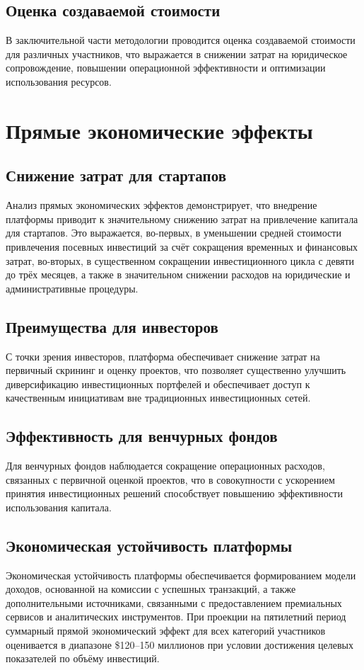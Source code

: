 \documentclass[
    candidate, %
    subf, %
    dotsinheaders=false,
]{disser}
\begin{document}
\subsection{Оценка создаваемой стоимости}
В заключительной части методологии проводится оценка создаваемой стоимости для различных участников, что выражается в снижении затрат на юридическое сопровождение, повышении операционной эффективности и оптимизации использования ресурсов.

\section{Прямые экономические эффекты}

\subsection{Снижение затрат для стартапов}
Анализ прямых экономических эффектов демонстрирует, что внедрение платформы приводит к значительному снижению затрат на привлечение капитала для стартапов. Это выражается, во-первых, в уменьшении средней стоимости привлечения посевных инвестиций за счёт сокращения временных и финансовых затрат, во-вторых, в существенном сокращении инвестиционного цикла с девяти до трёх месяцев, а также в значительном снижении расходов на юридические и административные процедуры.

\subsection{Преимущества для инвесторов}
С точки зрения инвесторов, платформа обеспечивает снижение затрат на первичный скрининг и оценку проектов, что позволяет существенно улучшить диверсификацию инвестиционных портфелей и обеспечивает доступ к качественным инициативам вне традиционных инвестиционных сетей.

\subsection{Эффективность для венчурных фондов}
Для венчурных фондов наблюдается сокращение операционных расходов, связанных с первичной оценкой проектов, что в совокупности с ускорением принятия инвестиционных решений способствует повышению эффективности использования капитала.

\subsection{Экономическая устойчивость платформы}
Экономическая устойчивость платформы обеспечивается формированием модели доходов, основанной на комиссии с успешных транзакций, а также дополнительными источниками, связанными с предоставлением премиальных сервисов и аналитических инструментов. При проекции на пятилетний период суммарный прямой экономический эффект для всех категорий участников оценивается в диапазоне \$120–150 миллионов при условии достижения целевых показателей по объёму инвестиций.
\end{document}

